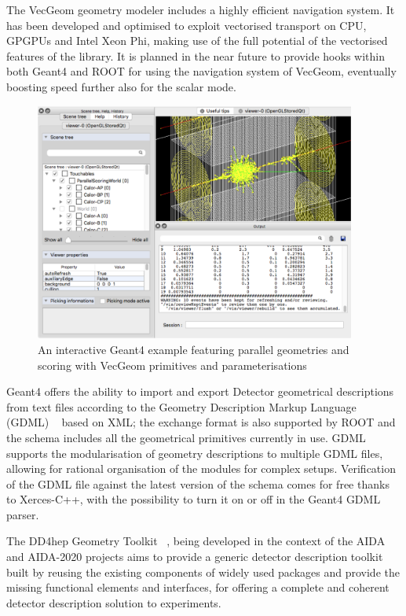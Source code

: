 \documentclass[12pt,a4paper]{article}
\begin{document}
The VecGeom geometry modeler includes a highly efficient navigation
system. It has been developed and optimised to exploit vectorised
transport on CPU, GPGPUs and Intel Xeon Phi, making use of the full
potential of the vectorised features of the library. It is planned in
the near future to provide hooks within both Geant4 and ROOT for using
the navigation system of VecGeom, eventually boosting speed further also
for the scalar mode.


\begin{figure}[bthp]
\vspace*{0.3cm}
\centering
\includegraphics[width=0.94\textwidth]{image1.png}
\caption{An interactive Geant4 example featuring parallel
geometries and scoring with VecGeom primitives and parameterisations}
\label{fig:geom}
\end{figure}


Geant4 offers the ability to import and export Detector geometrical
descriptions from text files according to the Geometry Description
Markup Language (GDML) ~\cite{1710291} based on XML; the exchange format is
also supported by ROOT and the schema includes all the geometrical
primitives currently in use. GDML supports the modularisation of
geometry descriptions to multiple GDML files, allowing for rational
organisation of the modules for complex setups. Verification of the GDML
file against the latest version of the schema comes for free thanks to
Xerces-C++, with the possibility to turn it on or off in the
Geant4 GDML parser.

The DD4hep Geometry Toolkit ~\cite{1742-6596-513-2-022010}, being developed in the context of
the AIDA and AIDA-2020 projects aims to provide a generic detector
description toolkit built by reusing the existing components of widely
used packages and provide the missing functional elements and
interfaces, for offering a complete and coherent detector description
solution to experiments.
\end{document}
